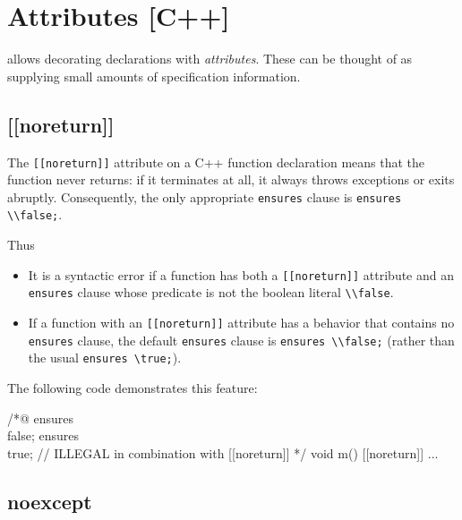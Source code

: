\section{Attributes [C++]}
\label{sec:attributes}

\experimental

\lang allows decorating declarations with \textit{attributes}. 
These can be thought of as supplying small amounts of specification information.

\subsection{[[noreturn]]}
\label{sec:noreturn}

The \lstinline|[[noreturn]]| attribute on a C++ function declaration means
that the function never returns: if it terminates at all, it always throws 
exceptions or exits abruptly. Consequently, the only appropriate \lstinline|ensures| clause
is \lstinline|ensures \\false;|.

Thus
\begin{itemize}
\item It is a syntactic error if a function has both a \lstinline|[[noreturn]]|
attribute and an \lstinline|ensures| clause whose predicate is not the 
boolean literal \lstinline|\\false|.
\item If a function with an \lstinline|[[noreturn]]| attribute has a behavior
that contains no \lstinline|ensures| clause, the default \lstinline|ensures|
clause is \lstinline|ensures \\false;| (rather than the usual \lstinline|ensures \true;|).
\end{itemize}

The following code demonstrates this feature:
\begin{example}
\begin{listing-nonumber}
/*@
ensures \\false;
ensures \\true; // ILLEGAL in combination with [[noreturn]]
*/
void m() [[noreturn]] { ... }
\end{listing-nonumber}
\end{example}


\subsection{noexcept}
\label{sec:noexcept}

